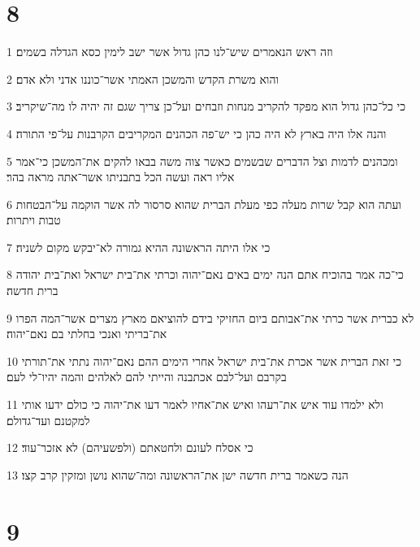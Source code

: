 \chapter{8}

\par 1 וזה ראש הנאמרים שיש־לנו כהן גדול אשר ישב לימין כסא הגדלה בשמים׃
\par 2 והוא משרת הקדש והמשכן האמתי אשר־כוננו אדני ולא אדם׃
\par 3 כי כל־כהן גדול הוא מפקד להקריב מנחות וזבחים ועל־כן צריך שגם זה יהיה לו מה־שיקריב׃
\par 4 והנה אלו היה בארץ לא היה כהן כי יש־פה הכהנים המקריבים הקרבנות על־פי התורה׃
\par 5 ומכהנים לדמות וצל הדברים שבשמים כאשר צוה משה בבאו להקים את־המשכן כי־אמר אליו ראה ועשה הכל בתבניתו אשר־אתה מראה בהר׃
\par 6 ועתה הוא קבל שרות מעלה כפי מעלת הברית שהוא סרסור לה אשר הוקמה על־הבטחות טבות ויתרות׃
\par 7 כי אלו היתה הראשונה ההיא גמורה לא־יבקש מקום לשניה׃
\par 8 כי־כה אמר בהוכיח אתם הנה ימים באים נאם־יהוה וכרתי את־בית ישראל ואת־בית יהודה ברית חדשה׃
\par 9 לא כברית אשר כרתי את־אבותם ביום החזיקי בידם להוציאם מארץ מצרים אשר־המה הפרו את־בריתי ואנכי בחלתי בם נאם־יהוה׃
\par 10 כי זאת הברית אשר אכרת את־בית ישראל אחרי הימים ההם נאם־יהוה נתתי את־תורתי בקרבם ועל־לבם אכתבנה והייתי להם לאלהים והמה יהיו־לי לעם׃
\par 11 ולא ילמדו עוד איש את־רעהו ואיש את־אחיו לאמר דעו את־יהוה כי כולם ידעו אותי למקטנם ועד־גדולם׃
\par 12 כי אסלח לעונם ולחטאתם (ולפשעיהם) לא אזכר־עוד׃
\par 13 הנה כשאמר ברית חדשה ישן את־הראשונה ומה־שהוא נושן ומזקין קרב קצו׃

\chapter{9}

